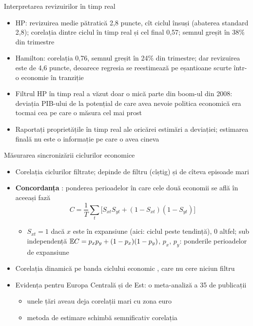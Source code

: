 \begin{frame}{Interpretarea revizuirilor în timp real}
\itemsize{\footnotesize}
\begin{itemize}
    \item HP: revizuirea medie pătratică 2{,}8 puncte, cît ciclul însuși (abaterea standard 2{,}8); corelația dintre ciclul în timp real și cel final 0{,}57; semnul greșit în 38\% din trimestre
    \item Hamilton: corelația 0{,}76, semnul greșit în 24\% din trimestre; dar revizuirea este de 4{,}6 puncte, deoarece regresia se reestimează pe eșantioane scurte într-o economie în tranziție
    \item Filtrul HP în timp real a văzut doar o mică parte din boom-ul din 2008: deviația PIB-ului de la potențial de care avea nevoie politica economică era tocmai cea pe care o măsura cel mai prost
    \item Raportați proprietățile în timp real ale oricărei estimări a deviației; estimarea finală nu este o informație pe care o avea cineva
\end{itemize}
\end{frame}

\begin{frame}{Măsurarea sincronizării ciclurilor economice}
\itemsize{\small}
\begin{itemize}
    \item Corelația ciclurilor filtrate; depinde de filtru (cîștig) și de cîteva episoade mari
    \item \textbf{Concordanța} : ponderea perioadelor în care cele două economii se află în aceeași fază
    \[ C = \frac1T\sum_t\big[S_{xt}S_{yt} + (1 - S_{xt})(1 - S_{yt})\big] \]
    \begin{itemize}
        \item $S_{xt} = 1$ dacă $x$ este în expansiune (aici: ciclul peste tendință), 0 altfel; sub independență $\mathbb{E} C = p_xp_y + (1 - p_x)(1 - p_y)$, $p_x$, $p_y$: ponderile perioadelor de expansiune
    \end{itemize}
    \item Corelația dinamică pe banda ciclului economic , care nu cere niciun filtru
    \item Evidența pentru Europa Centrală și de Est: o meta-analiză a 35 de publicații 
    \begin{itemize}
        \item unele țări aveau deja corelații mari cu zona euro
        \item metoda de estimare schimbă semnificativ corelația
    \end{itemize}
\end{itemize}
\end{frame}

